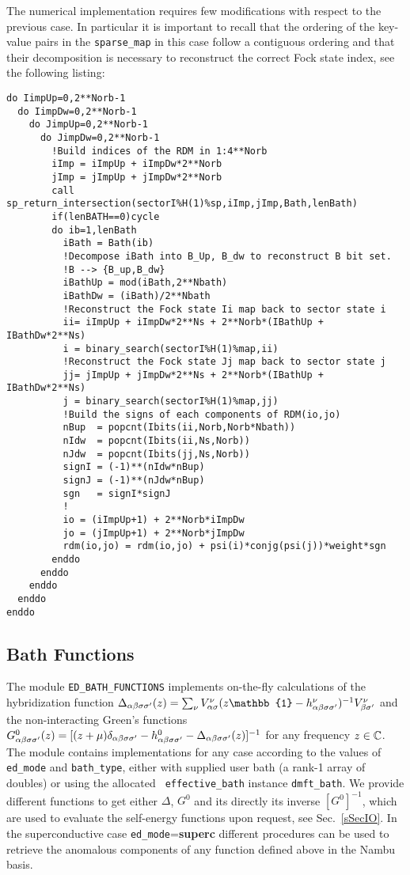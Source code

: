 \documentclass[preprint,3p,10pt]{elsarticle}
\newcommand{\secu}[1]
{Sec.~\ref{#1}}
\def\a{\alpha}       \def\b{\beta}   \def\g{\gamma}   \def\d{\delta}
\def\11{\mathbb{1}}
\begin{document}
The numerical implementation requires few modifications with respect
to the previous case. In particular it is important to recall that the
ordering of the key-value pairs in the {\tt sparse\_map} in this case
follow a contiguous ordering and that their decomposition is necessary
to reconstruct the correct Fock state index, see the following
listing:
\begin{lstlisting}[style=fstyle,numbers=none,basicstyle={\scriptsize\ttfamily}]
do IimpUp=0,2**Norb-1
  do IimpDw=0,2**Norb-1
    do JimpUp=0,2**Norb-1
      do JimpDw=0,2**Norb-1
        !Build indices of the RDM in 1:4**Norb
        iImp = iImpUp + iImpDw*2**Norb
        jImp = jImpUp + jImpDw*2**Norb
        call sp_return_intersection(sectorI%H(1)%sp,iImp,jImp,Bath,lenBath)
        if(lenBATH==0)cycle
        do ib=1,lenBath
          iBath = Bath(ib)
          !Decompose iBath into B_Up, B_dw to reconstruct B bit set. 
          !B --> {B_up,B_dw}
          iBathUp = mod(iBath,2**Nbath)
          iBathDw = (iBath)/2**Nbath
          !Reconstruct the Fock state Ii map back to sector state i
          ii= iImpUp + iImpDw*2**Ns + 2**Norb*(IBathUp + IBathDw*2**Ns)
          i = binary_search(sectorI%H(1)%map,ii)
          !Reconstruct the Fock state Jj map back to sector state j
          jj= jImpUp + jImpDw*2**Ns + 2**Norb*(IBathUp + IBathDw*2**Ns)
          j = binary_search(sectorI%H(1)%map,jj)
          !Build the signs of each components of RDM(io,jo)
          nBup  = popcnt(Ibits(ii,Norb,Norb*Nbath))
          nIdw  = popcnt(Ibits(ii,Ns,Norb))
          nJdw  = popcnt(Ibits(jj,Ns,Norb))
          signI = (-1)**(nIdw*nBup)
          signJ = (-1)**(nJdw*nBup)
          sgn   = signI*signJ
          !  
          io = (iImpUp+1) + 2**Norb*iImpDw
          jo = (jImpUp+1) + 2**Norb*jImpDw
          rdm(io,jo) = rdm(io,jo) + psi(i)*conjg(psi(j))*weight*sgn
        enddo
      enddo
    enddo
  enddo
enddo
\end{lstlisting}



\subsection{Bath Functions}\label{sSecFunc}
The module {\tt ED\_BATH\_FUNCTIONS} implements on-the-fly
calculations of the hybridization function $\Delta_{\a\b\s\s'}(z)=\sum_\nu
{V^\nu_{\a\s}}(z\11-h^\nu_{\a\b\s\s'})^{-1}V^\nu_{\b\s'}$ and the
non-interacting Green's functions $G^0_{\a\b\s\s'}(z) =
[(z + \mu)\delta_{\a\b\s\s'} - h^0_{\a\b\s\s'} -
\Delta_{\a\b\s\s'}(z)]^{-1}$ for any frequency $z\in\mathbb{C}$. 
The module contains implementations for any case according to the
values of {\tt ed\_mode} and {\tt bath\_type}, either with supplied
user bath (a rank-1 array of doubles) or using the allocated {\tt
  effective\_bath} instance {\tt dmft\_bath}. 
We provide different functions to get either $\Delta$, $G^0$ and its
directly its inverse $[G^0]^{-1}$, which are used to evaluate the
self-energy functions upon request, see \secu{sSecIO}.
In the superconductive case {\tt ed\_mode}={\bf superc} different
procedures can be used to retrieve the anomalous components of any
function defined above in the Nambu basis. 
\end{document}
